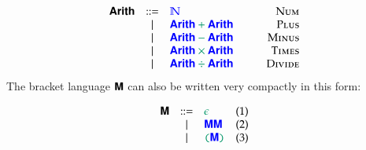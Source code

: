 \documentclass{book}
\begin{document}
\begin{displaymath}
\begin{array}{lclr}
  \sansbold{Arith} & ::= & \meta{\mathbb{N}} &\textsc{Num} \\
                   & |   & \conc{\meta{\sansbold{Arith}} + \meta{\sansbold{Arith}}}\quad\quad & \textsc{Plus} \\
                   & |   & \conc{\meta{\sansbold{Arith}} - \meta{\sansbold{Arith}}} & \textsc{Minus} \\
                   & |   & \conc{\meta{\sansbold{Arith}} \times \meta{\sansbold{Arith}}} & \textsc{Times} \\
                   & |   & \conc{\meta{\sansbold{Arith}} \div \meta{\sansbold{Arith}}} & \textsc{Divide} \\
\end{array}
\end{displaymath}
The bracket language $\textsf{\textbf{M}}$ can also be written very compactly in this form:

\begin{displaymath}
\begin{array}{lclr}
  \sansbold{M} & ::= & \conc{\epsilon} & (1) \\
               & |   & \meta{\sansbold{M}} \meta{\sansbold{M}} & (2) \\
               & |   & \mconc{(}\meta{\sansbold{M}}\mconc{)} & (3) \\
\end{array}
\end{displaymath}
\end{document}
